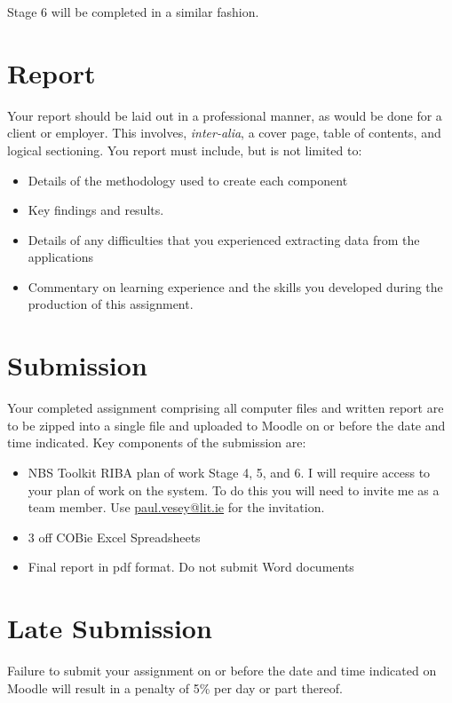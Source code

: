 Stage 6 will be completed in a similar fashion.\\



\newpage
\section*{Report}
Your report should be laid out in a professional manner, as would be done for a client or employer.  This involves, \emph{inter-alia}, a cover page, table of contents, and logical sectioning.  You report must include, but is not limited to:
\begin{itemize}
	\item Details of the methodology used to create each component
	\item Key findings and results.
	\item Details of any difficulties that you experienced extracting data from the applications
	\item Commentary on learning experience and the skills you developed during the production of this assignment.
\end{itemize}
  


\section*{Submission}
Your completed assignment comprising all computer files and written report are to be zipped into a single file and uploaded to Moodle on or before the date and time indicated.  Key components of the submission are:
\begin{itemize}
	\item NBS Toolkit RIBA plan of work Stage 4, 5, and 6.  I will require access to your plan of work on the system.  To do this you will need to invite me as a team member.  Use \href{mailto:paul.vesey@lit.ie}{paul.vesey@lit.ie} for the invitation.
	\item 3 off COBie Excel Spreadsheets
	\item Final report in pdf format.  Do not submit Word documents
\end{itemize}




\section*{Late Submission}
Failure to submit your assignment on or before the date and time indicated on Moodle will result in a penalty of 5\% per day or part thereof.

